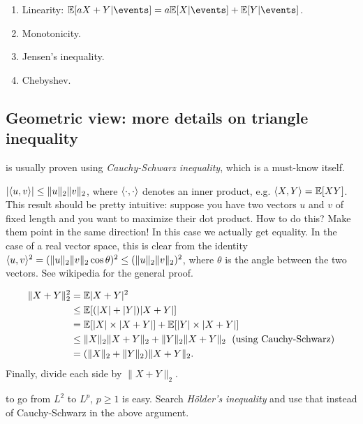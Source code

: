 \documentclass{article}
\begin{document}
\begin{enumerate}
  \item Linearity: $\E[a X + Y|\events] = a \E[X|\events] + \E[Y|\events]$.
  \item Monotonicity.
  \item Jensen's inequality.
  \item Chebyshev.
\end{enumerate}


\subsection{Geometric view: more details on triangle inequality}

 is usually proven using \emph{Cauchy-Schwarz inequality}, which is a must-know itself.

 $|\langle u, v\rangle| \le \| u \|_2 \| v \|_2$, where $\langle \cdot, \cdot\rangle$ denotes an inner product, e.g. $\langle X, Y\rangle = {\mathbb E}[X Y]$. This result should be pretty intuitive: suppose you have two vectors $u$ and $v$ of fixed length and you want to maximize their dot product. How to do this? Make them point in the same direction! In this case we actually get equality. In the case of a real vector space, this is clear from the identity $\langle u, v\rangle^2 = (\| u \|_2 \| v \|_2 \cos \theta)^2 \le (\| u \|_2 \| v \|_2)^2$, where $\theta$ is the angle between the two vectors. See wikipedia for the general proof.


\begin{align*}
\| X + Y \|_2^2 &= {\mathbb E} | X + Y |^2 \\
&\le {\mathbb E} [ (|X| + |Y|) |X + Y| ] \\
&= {\mathbb E} [ |X|\times|X + Y| ] + {\mathbb E} [ |Y|\times|X + Y| ] \\
&\le \| X \|_2 \|X + Y\|_2 + \| Y \|_2 \|X + Y\|_2 \;\text{ (using Cauchy-Schwarz)}  \\
&= ( \| X \|_2 + \| Y \|_2 ) \|X + Y\|_2.
\end{align*} 
Finally, divide each side by $\|X + Y\|_2$.

 to go from $L^2$ to $L^p$, $p \ge 1$ is easy. Search \emph{H\"{o}lder's inequality} and use that instead of Cauchy-Schwarz in the above argument. 
\end{document}
